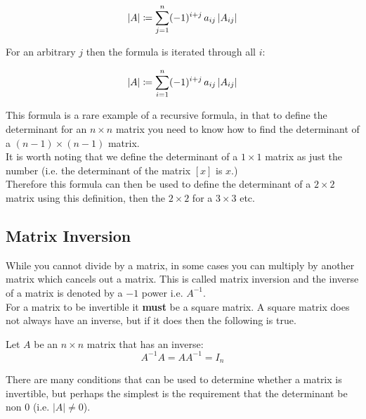 \documentclass[main.tex]{subfiles}
\begin{document}
                    \begin{equation}
                        |A| \coloneqq \sum_{j = 1}^n (-1)^{i + j}\,a_{ij}\,|A_{ij}|
                    \end{equation}

                    For an arbitrary $j$ then the formula is iterated through all $i$:

                    \begin{equation}
                        |A| \coloneqq \sum_{i = 1}^n (-1)^{i + j}\,a_{ij}\,|A_{ij}|
                    \end{equation}

                    This formula is a rare example of a recursive formula, in that to define the determinant for an $n \times n$ matrix you need to know how to find the determinant of a $(n-1) \times (n-1)$ matrix.\\
                    It is worth noting that we define the determinant of a $1\times 1$ matrix as just the number (i.e. the determinant of the matrix $[x]$ is $x$.)\\
                    Therefore this formula can then be used to define the determinant of a $2 \times 2$ matrix using this definition, then the $2 \times 2$ for a $3 \times 3$ etc.


                \subsection{Matrix Inversion}

                    While you cannot divide by a matrix, in some cases you can multiply by another matrix which cancels out a matrix. This is called matrix inversion and the inverse of a matrix is denoted by a $-1$ power i.e. $A^{-1}$.\\
                    For a matrix to be invertible it \textbf{must} be a square matrix. A square matrix does not always have an inverse, but if it does then the following is true.

                    Let $A$ be an $n \times n$ matrix that has an inverse:
                    \begin{equation}
                        A^{-1}A = AA^{-1} = I_n
                    \end{equation}


                    There are many conditions that can be used to determine whether a matrix is invertible, but perhaps the simplest is the requirement that the determinant be non 0 (i.e. $|A| \neq 0$).
\end{document}
